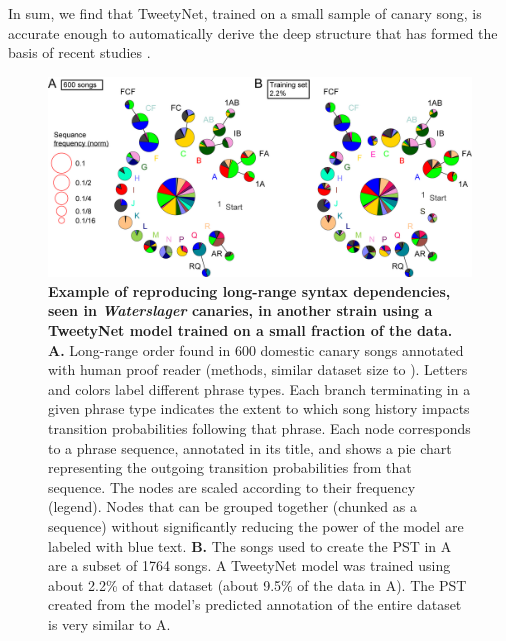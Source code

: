 \documentclass[10pt,letterpaper]{article}
\begin{document}
In sum, we find that TweetyNet, trained on a small sample of canary song, is accurate enough to automatically derive the deep structure that has formed the basis of recent studies \cite{markowitz_long-range_2013,cohen_hidden_2020}.




\begin{figure}[!ht]
\includegraphics[scale=0.85]{Figures/fig8/Figure8_v7.png}
\caption{{\bf Example of reproducing long-range syntax dependencies, seen in \textit{Waterslager} canaries, in another strain using a TweetyNet model trained on a small fraction of the data.}
\textbf{A.} Long-range order found in 600 domestic canary songs annotated with human proof reader (methods, similar dataset size to \cite{markowitz_long-range_2013}). Letters and colors label different phrase types. Each branch terminating in a given phrase type indicates the extent to which song history impacts transition probabilities following that phrase. Each node corresponds to a phrase sequence, annotated in its title, and shows a pie chart representing the outgoing transition probabilities from that sequence. The nodes are scaled according to their frequency (legend). Nodes that can be grouped together (chunked as a sequence) without significantly reducing the power of the model are labeled with blue text.
\textbf{B.} The songs used to create the PST in A are a subset of 1764 songs. A TweetyNet model was trained using about 2.2\% of that dataset (about 9.5\% of the data in A). The PST created from the model's predicted annotation of the entire dataset is very similar to A.}
\label{fig8}
\end{figure}
\end{document}
